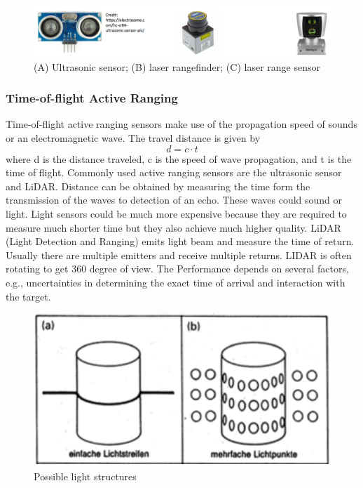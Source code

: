 \begin{figure}
\centering
\includegraphics[scale=0.4]{ultra.png}
\caption{(A) Ultrasonic sensor; (B) laser rangefinder; (C) laser range sensor}
\label{fig:active_range}
\end{figure}

\subsubsection{Time-of-flight Active Ranging}
Time-of-flight active ranging sensors make use of the propagation speed of sounds or an electromagnetic wave. The travel distance is given by
$$d = c \cdot t$$
where d is the distance traveled, c is the speed of wave propagation, and t is the time of flight. Commonly used active ranging sensors are the ultrasonic sensor and LiDAR. Distance can be obtained by measuring the time form the transmission of the waves to detection of an echo. These waves could sound or light. Light sensors could be much more expensive because they are required to measure much shorter time but they also achieve much higher quality. LiDAR (Light Detection and Ranging) emits light beam and measure the time of return. Usually there are multiple emitters and receive multiple returns. LIDAR is often rotating to get 360 degree of view. The Performance depends on several factors, e.g., uncertainties in determining the exact time of arrival and interaction with the target.
\begin{figure}
\centering
\includegraphics[scale=0.2]{light.png}
\caption{Possible light structures \cite{SNS}}
\label{fig:3D_light}
\end{figure}


